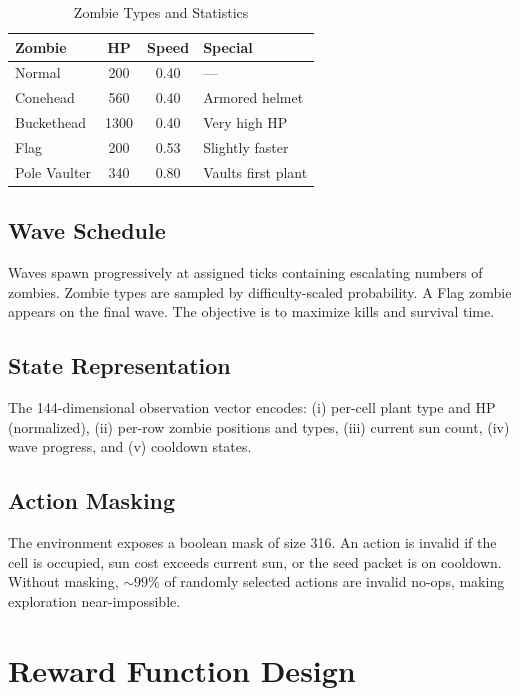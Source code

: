 \documentclass[conference]{IEEEtran}
\begin{document}
\begin{table}[htbp]
\centering
\caption{Zombie Types and Statistics}
\label{tab:zombies}
\begin{tabular}{@{}lccl@{}}
\toprule
\textbf{Zombie} & \textbf{HP} & \textbf{Speed} & \textbf{Special} \\
\midrule
Normal & 200 & 0.40 & --- \\
Conehead & 560 & 0.40 & Armored helmet \\
Buckethead & 1300 & 0.40 & Very high HP \\
Flag & 200 & 0.53 & Slightly faster \\
Pole Vaulter & 340 & 0.80 & Vaults first plant \\
\bottomrule
\end{tabular}
\end{table}

\subsection{Wave Schedule}
Waves spawn progressively at assigned ticks containing escalating numbers of zombies. Zombie types are sampled by difficulty-scaled probability. A Flag zombie appears on the final wave. The objective is to maximize kills and survival time.

\subsection{State Representation}
The 144-dimensional observation vector encodes: (i) per-cell plant type and HP (normalized), (ii) per-row zombie positions and types, (iii) current sun count, (iv) wave progress, and (v) cooldown states.

\subsection{Action Masking}
The environment exposes a boolean mask of size 316. An action is invalid if the cell is occupied, sun cost exceeds current sun, or the seed packet is on cooldown. Without masking, ${\sim}99\%$ of randomly selected actions are invalid no-ops, making exploration near-impossible.

\section{Reward Function Design}
\end{document}

